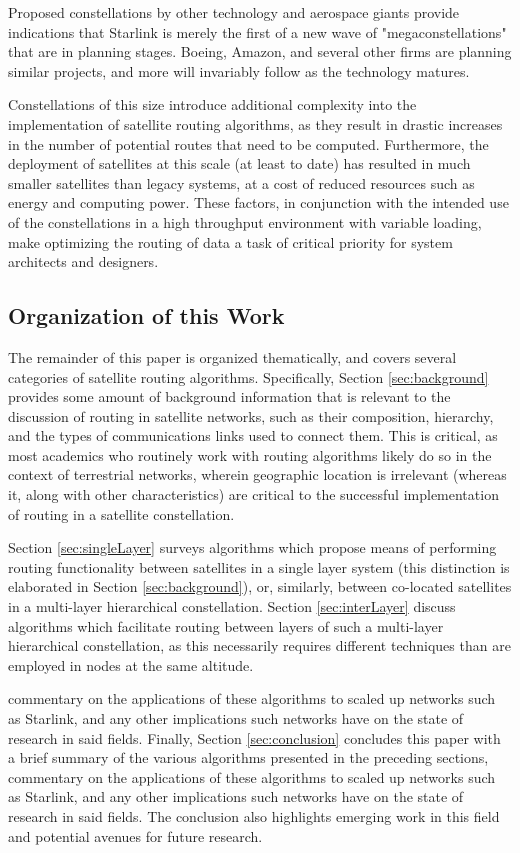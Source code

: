 Proposed constellations by other technology and aerospace giants provide indications that Starlink is merely the first of a new wave of "megaconstellations" that are in planning stages. Boeing, Amazon, and several other firms are planning similar projects, and more will invariably follow as the technology matures.

Constellations of this size introduce additional complexity into the implementation of satellite routing algorithms, as they result in drastic increases in the number of potential routes that need to be computed. Furthermore, the deployment of satellites at this scale (at least to date) has resulted in much smaller satellites than legacy systems, at a cost of reduced resources such as energy and computing power. These factors, in conjunction with the intended use of the constellations in a high throughput environment with variable loading, make optimizing the routing of data a task of critical priority for system architects and designers.

\subsection{Organization of this Work}\label{subsec:organization}
The remainder of this paper is organized thematically, and covers several categories of satellite routing algorithms. Specifically, Section \ref{sec:background} provides some amount of background information that is relevant to the discussion of routing in satellite networks, such as their composition, hierarchy, and the types of communications links used to connect them. This is critical, as most academics who routinely work with routing algorithms likely do so in the context of terrestrial networks, wherein geographic location is irrelevant (whereas it, along with other characteristics) are critical to the successful implementation of routing in a satellite constellation. 

Section \ref{sec:singleLayer} surveys algorithms which propose means of performing routing functionality between satellites in a single layer system (this distinction is elaborated in Section \ref{sec:background}), or, similarly, between co-located satellites in a multi-layer hierarchical constellation. Section \ref{sec:interLayer} discuss algorithms which facilitate routing between layers of such a multi-layer hierarchical constellation, as this necessarily requires different techniques than are employed in nodes at the same altitude.  

commentary on the applications of these algorithms to scaled up networks such as Starlink, and any other implications such networks have on the state of research in said fields. Finally, Section \ref{sec:conclusion} concludes this paper with a brief summary of the various algorithms presented in the preceding sections, commentary on the applications of these algorithms to scaled up networks such as Starlink, and any other implications such networks have on the state of research in said fields. The conclusion also highlights emerging work in this field and potential avenues for future research.
